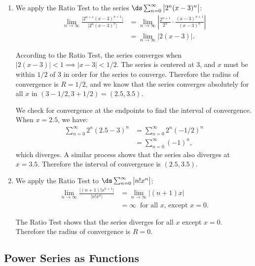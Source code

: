 {\begin{enumerate}
	When $x=1$, we have the series $\ds \sum_{n=1}^\infty (-1)^{n+1}\frac{(1)^n}{n}$, which is the Alternating Harmonic Series, which converges. Therefore the interval of convergence is $(-1,1]$.
	
	\item		We apply the Ratio Test to the series $\ds\sum_{n=0}^\infty \big|2^n(x-3)^n\big|$:
	\begin{align*}
	\lim_{n\to\infty} \frac{\big| 2^{n+1}(x-3)^{n+1}\big|}{\big|2^n(x-3)^n\big|} &= \lim_{n\to\infty} \left|\frac{2^{n+1}}{2^n}\cdot\frac{(x-3)^{n+1}}{(x-3)^n}\right|\\
			&=\lim_{n\to\infty} \big|2(x-3)\big|.
	\end{align*}
	
According to the Ratio Test, the series converges when $\big|2(x-3)\big|<1 \implies \big|x-3\big| < 1/2$. The series is centered at 3, and $x$ must be within $1/2$ of 3 in order for the series to converge. Therefore the radius of convergence is $R=1/2$, and we know that the series converges absolutely for all $x$ in $(3-1/2,3+1/2) = (2.5, 3.5)$.

We check for convergence at the endpoints to find the interval of convergence. When $x=2.5$, we have:
\begin{align*}
\sum_{n=0}^\infty 2^n(2.5-3)^n &= \sum_{n=0}^\infty 2^n(-1/2)^n \\
			&=\sum_{n=0}^\infty (-1)^n,
\end{align*}
which diverges. A similar process shows that the series also diverges at $x=3.5$. Therefore the interval of convergence is $(2.5, 3.5)$.

\item		We apply the Ratio Test to $\ds \sum_{n=0}^\infty \big|n!x^n\big|$:
\begin{align*}
\lim_{n\to\infty} \frac{\big| (n+1)!x^{n+1}\big|}{\big|n!x^n\big|} &= \lim_{n\to\infty} \big|(n+1)x\big|\\
		&= \infty\ \text{ for all $x$, except $x=0$.}
\end{align*}

The Ratio Test shows that the series diverges for all $x$ except $x=0$. Therefore the radius of convergence is $R=0$.\eoehere
\end{enumerate}}

\subsection*{Power Series as Functions}

